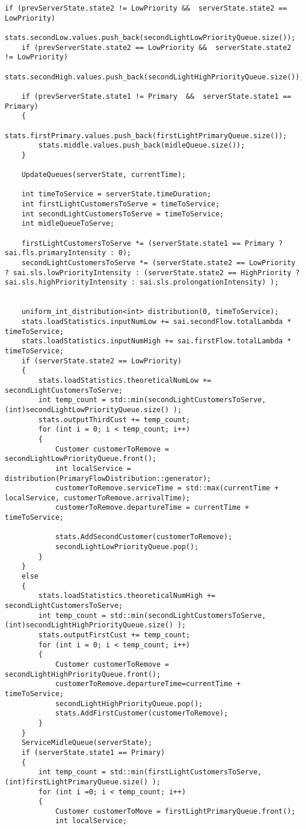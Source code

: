 \begin{lstlisting}[language={[ISO]C++}]
    if (prevServerState.state2 != LowPriority &&  serverState.state2 == LowPriority)
        stats.secondLow.values.push_back(secondLightLowPriorityQueue.size());
    if (prevServerState.state2 == LowPriority &&  serverState.state2 != LowPriority)
        stats.secondHigh.values.push_back(secondLightHighPriorityQueue.size());
      
    if (prevServerState.state1 != Primary  &&  serverState.state1 == Primary)
    {
        stats.firstPrimary.values.push_back(firstLightPrimaryQueue.size());
        stats.middle.values.push_back(midleQueue.size());
    }

    UpdateQueues(serverState, currentTime);

    int timeToService = serverState.timeDuration;
    int firstLightCustomersToServe = timeToService;
    int secondLightCustomersToServe = timeToService;
    int midleQueueToServe;

    firstLightCustomersToServe *= (serverState.state1 == Primary ? sai.fls.primaryIntensity : 0);
    secondLightCustomersToServe *= (serverState.state2 == LowPriority ? sai.sls.lowPriorityIntensity : (serverState.state2 == HighPriority ? sai.sls.highPriorityIntensity : sai.sls.prolongationIntensity) );


    uniform_int_distribution<int> distribution(0, timeToService);
    stats.loadStatistics.inputNumLow += sai.secondFlow.totalLambda * timeToService;
    stats.loadStatistics.inputNumHigh += sai.firstFlow.totalLambda * timeToService;
    if (serverState.state2 == LowPriority)
    {
        stats.loadStatistics.theoreticalNumLow += secondLightCustomersToServe;
        int temp_count = std::min(secondLightCustomersToServe,(int)secondLightLowPriorityQueue.size() );
        stats.outputThirdCust += temp_count;
        for (int i = 0; i < temp_count; i++)
  	    {
            Customer customerToRemove = secondLightLowPriorityQueue.front();
            int localService = distribution(PrimaryFlowDistribution::generator);
            customerToRemove.serviceTime = std::max(currentTime + localService, customerToRemove.arrivalTime);
            customerToRemove.departureTime = currentTime + timeToService;

            stats.AddSecondCustomer(customerToRemove);
            secondLightLowPriorityQueue.pop();
  	    }
    }
    else
    {
        stats.loadStatistics.theoreticalNumHigh += secondLightCustomersToServe;
        int temp_count = std::min(secondLightCustomersToServe,(int)secondLightHighPriorityQueue.size() );
        stats.outputFirstCust += temp_count;
        for (int i = 0; i < temp_count; i++)
  	    {
            Customer customerToRemove = secondLightHighPriorityQueue.front();
            customerToRemove.departureTime=currentTime + timeToService;
            secondLightHighPriorityQueue.pop();
            stats.AddFirstCustomer(customerToRemove);
  	    }
    }
    ServiceMidleQueue(serverState);
    if (serverState.state1 == Primary)
    {
        int temp_count = std::min(firstLightCustomersToServe,(int)firstLightPrimaryQueue.size() );
        for (int i =0; i < temp_count; i++)
  	    {
            Customer customerToMove = firstLightPrimaryQueue.front();
            int localService;


\end{lstlisting}
